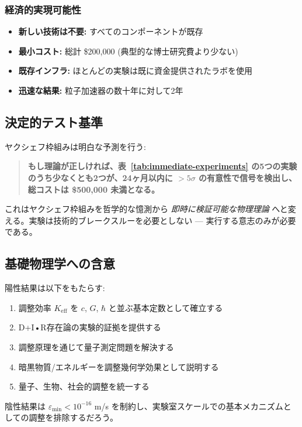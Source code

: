 \documentclass[11pt,a4paper]{article}
\begin{document}
	\subsubsection{経済的実現可能性}
	\begin{itemize}
		\item \textbf{新しい技術は不要:} すべてのコンポーネントが既存
		\item \textbf{最小コスト:} 総計 \$200,000 (典型的な博士研究費より少ない)
		\item \textbf{既存インフラ:} ほとんどの実験は既に資金提供されたラボを使用
		\item \textbf{迅速な結果:} 粒子加速器の数十年に対して2年
	\end{itemize}
	
	\subsection{決定的テスト基準}
	
	ヤクシェフ枠組みは明白な予測を行う:
	
	\begin{quote}
		\textbf{もし理論が正しければ、表~\ref{tab:immediate-experiments} の5つの実験のうち少なくとも2つが、24ヶ月以内に $>5\sigma$ の有意性で信号を検出し、総コストは \$500,000 未満となる。}
	\end{quote}
	
	これはヤクシェフ枠組みを哲学的な憶測から \emph{即時に検証可能な物理理論} へと変える。実験は技術的ブレークスルーを必要としない — 実行する意志のみが必要である。
	
	\subsection{基礎物理学への含意}
	
	陽性結果は以下をもたらす:
	\begin{enumerate}
		\item 調整効率 $K_{\mathrm{eff}}$ を $c$, $G$, $\hbar$ と並ぶ基本定数として確立する
		\item D+I•R存在論の実験的証拠を提供する
		\item 調整原理を通じて量子測定問題を解決する
		\item 暗黒物質/エネルギーを調整幾何学効果として説明する
		\item 量子、生物、社会的調整を統一する
	\end{enumerate}
	
	陰性結果は $\varepsilon_{\min} < 10^{-16}$ m/s を制約し、実験室スケールでの基本メカニズムとしての調整を排除するだろう。
	
\end{document}
